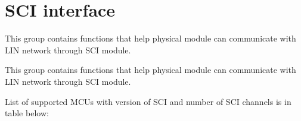 \hypertarget{group___s_c_i__group}{}\section{S\+C\+I interface}
\label{group___s_c_i__group}


This group contains functions that help physical module can communicate with L\+I\+N network through S\+C\+I module.  


This group contains functions that help physical module can communicate with L\+I\+N network through S\+C\+I module. 

List of supported M\+C\+Us with version of S\+C\+I and number of S\+C\+I channels is in table below\+:  